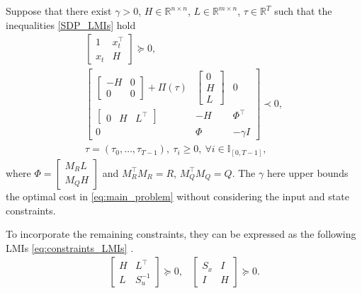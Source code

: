 Suppose that there exist $\gamma > 0$, $H \in \mathbb{R}^{n \times n}$, $L \in \mathbb{R}^{m \times n}$, $\tau \in \mathbb{R}^T$ such that the inequalities \eqref{SDP_LMIs} hold
	\begin{subequations}
		\begin{gather}
			\begin{bmatrix}
				1 & x_t^\top \\
				x_t & H
			\end{bmatrix} \succeq 0,
			\\
			\begin{bmatrix}
				\begin{bmatrix}
				-H & 0 \\
				 0 & 0
				\end{bmatrix}
				+
				\Pi(\tau)
				&
				\begin{bmatrix}
					0 \\
				    H \\
				    L
				\end{bmatrix}
				&
				0 \\
				\begin{bmatrix}
				0 & H & L^\top
				\end{bmatrix}
				& -H & \Phi^\top \\
				0 & \Phi & -\gamma I
			\end{bmatrix} \prec 0,
			\\
			\tau = (\tau_0, \ldots, \tau_{T-1}), \ \tau_i \geq 0, \ \forall i \in \mathbb{I}_{[0, T-1]},
		\end{gather}
	\end{subequations}
where $\Phi = \begin{bmatrix} M_R L \\ M_Q H \end{bmatrix}$ and $M_R^\top M_R = R$, $M_Q^\top M_Q = Q$.
The $\gamma$ here upper bounds the optimal cost in \eqref{eq:main_problem} without considering the input and state constraints.

To incorporate the remaining constraints, they can be expressed as the following LMIs \eqref{eq:constraints_LMIs} \cite{xie2024}.
\begin{subequations}
	\begin{align*}
		\begin{bmatrix}
			H & L^\top \\
			L & S_u^{-1}
		\end{bmatrix} \succeq 0,
	\end{align*}
	\begin{align*}
		\begin{bmatrix}
			S_x & I \\
			I & H
		\end{bmatrix} \succeq 0.
	\end{align*}
\end{subequations}

